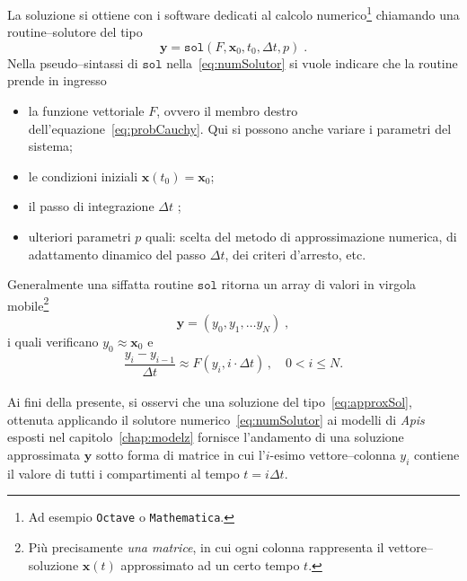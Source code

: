 La soluzione si ottiene con i software dedicati al calcolo numerico\footnote{Ad esempio \texttt{Octave} o
\texttt{Mathematica}.} chiamando una routine--solutore del tipo
\begin{equation}
\mathbf{y} = \mathtt{sol} ( F, \mathbf{x}_0, t_0, \Delta t, p) \; .
\label{eq:numSolutor}
\end{equation}
Nella pseudo--sintassi di $\mathtt{sol}$ nella~\eqref{eq:numSolutor} si vuole indicare che la routine prende in ingresso
\begin{itemize}
    \item la funzione vettoriale $F$, ovvero il membro destro dell'equazione~\eqref{eq:probCauchy}.
        Qui si possono anche variare i parametri del sistema;
    \item le condizioni iniziali $\mathbf{x} (t_0) = \mathbf{x}_0$;
    \item il passo di integrazione $\Delta t$ ;
    \item ulteriori parametri $p$ quali: scelta del metodo di approssimazione numerica, di adattamento dinamico del passo
        $\Delta t$, dei criteri d'arresto, etc.
\end{itemize}
Generalmente una siffatta routine $\mathtt{sol}$ ritorna un array di valori in virgola mobile\footnote{Più
precisamente \emph{una matrice}, in cui ogni colonna rappresenta il vettore--soluzione $\mathbf{x}(t)$ approssimato
ad un certo tempo $t$.}
\begin{equation}
\mathbf{y} = \left( y_0, y_1, \dots y_N \right) \; ,
\label{eq:approxSol}
\end{equation}
i quali verificano $y_0 \approx \mathbf{x}_0$ e
$$\frac{y_i - y_{i-1}}{\Delta t} \approx F \left( y_i, i \cdot \Delta t \right) \, , \quad 0 < i \leq N.$$

\paragraph{}
Ai fini della presente, si osservi che una soluzione del tipo~\eqref{eq:approxSol}, ottenuta applicando il solutore
numerico~\eqref{eq:numSolutor} ai modelli di \emph{Apis} esposti nel capitolo~\ref{chap:modelz} fornisce l'andamento
di una soluzione approssimata $\mathbf{y}$ sotto forma di matrice in cui l'$i$-esimo
vettore--colonna $y_i$ contiene il valore di
tutti i compartimenti al tempo $t = i \Delta t$.


